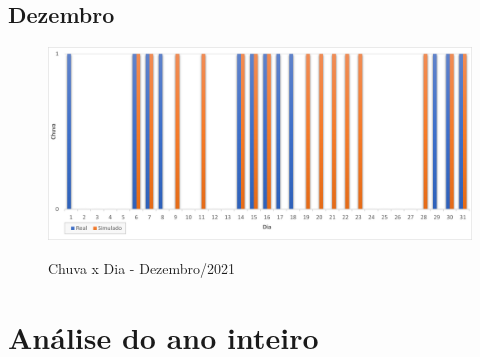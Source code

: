 \subsection{Dezembro}
\begin{figure}[H]
	\caption{\small Chuva x Dia - Dezembro/2021}
	\centering
	\includegraphics[width=\textwidth]{figs/dez.png}
	\label{f.rdez}
\end{figure}


\section{Análise do ano inteiro}